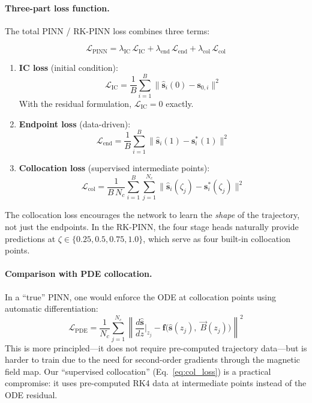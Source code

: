 \documentclass[11pt,a4paper]{article}
\newcommand{\zfrac}{\zeta}
\newcommand{\vstate}{\mathbf{s}}
\newcommand{\vB}{\vec{B}}
\newcommand{\IC}{\mathrm{IC}}
\begin{document}
\paragraph{Three-part loss function.}
The total PINN / RK-PINN loss combines three terms:

\begin{equation}\label{eq:pinn_loss}
  \boxed{\;
    \mathcal{L}_{\mathrm{PINN}}
    = \lambda_{\IC}\,\mathcal{L}_{\IC}
    + \lambda_{\mathrm{end}}\,\mathcal{L}_{\mathrm{end}}
    + \lambda_{\mathrm{col}}\,\mathcal{L}_{\mathrm{col}}
  \;}
\end{equation}

\begin{enumerate}[nosep]
  \item \textbf{IC loss} (initial condition):
  \begin{equation}\label{eq:ic_loss}
    \mathcal{L}_{\IC} = \frac{1}{B}\sum_{i=1}^{B}
    \bigl\|\hat{\vstate}_i(0) - \vstate_{0,i}\bigr\|^2
  \end{equation}
  With the residual formulation, $\mathcal{L}_{\IC}=0$ exactly.

  \item \textbf{Endpoint loss} (data-driven):
  \begin{equation}\label{eq:end_loss}
    \mathcal{L}_{\mathrm{end}} = \frac{1}{B}\sum_{i=1}^{B}
    \bigl\|\hat{\vstate}_i(1) - \vstate^*_i(1)\bigr\|^2
  \end{equation}

  \item \textbf{Collocation loss} (supervised intermediate points):
  \begin{equation}\label{eq:col_loss}
    \mathcal{L}_{\mathrm{col}} = \frac{1}{B\,N_c}
    \sum_{i=1}^{B}\sum_{j=1}^{N_c}
    \bigl\|\hat{\vstate}_i(\zfrac_j) - \vstate^*_i(\zfrac_j)\bigr\|^2
  \end{equation}
\end{enumerate}

The collocation loss encourages the network to learn the \emph{shape} of
the trajectory, not just the endpoints.  In the RK-PINN, the four stage
heads naturally provide predictions at $\zfrac\in\{0.25, 0.5, 0.75, 1.0\}$,
which serve as four built-in collocation points.

\paragraph{Comparison with PDE collocation.}
In a ``true'' PINN, one would enforce the ODE at collocation points using
automatic differentiation:
\begin{equation}\label{eq:pde_collocation}
  \mathcal{L}_{\mathrm{PDE}} = \frac{1}{N_c}\sum_{j=1}^{N_c}
  \left\|\frac{d\hat{\vstate}}{dz}\bigg|_{z_j}
  - \mathbf{f}\bigl(\hat{\vstate}(z_j),\;\vB(z_j)\bigr)\right\|^2
\end{equation}
This is more principled---it does not require pre-computed trajectory
data---but is harder to train due to the need for second-order gradients
through the magnetic field map.  Our ``supervised collocation''
(Eq.~\ref{eq:col_loss}) is a practical compromise: it uses pre-computed
RK4 data at intermediate points instead of the ODE residual.
\end{document}
